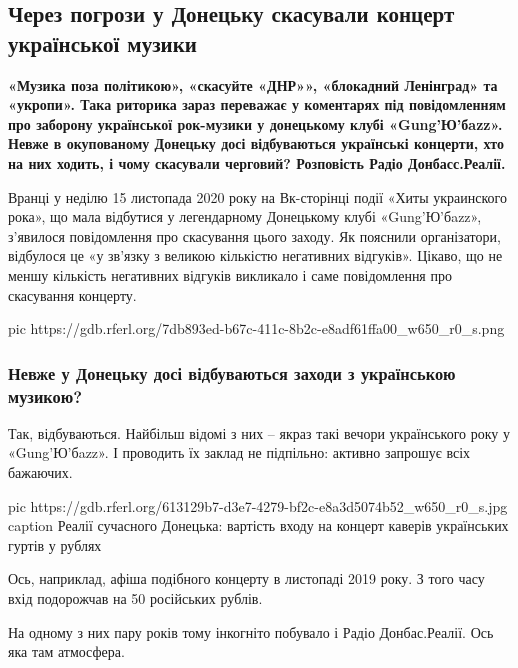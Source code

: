  
 
 
 
\subsection{Через погрози у Донецьку скасували концерт української музики}

{\bfseries
«Музика поза політикою», «скасуйте «ДНР»», «блокадний Ленінград» та
«укропи». Така риторика зараз переважає у коментарях під повідомленням
про заборону української рок-музики у донецькому клубі «Gung'Ю'бazz».
Невже в окупованому Донецьку досі відбуваються українські концерти, хто на
них ходить, і чому скасували черговий? Розповість Радіо Донбасс.Реалії.
}

Вранці у неділю 15 листопада 2020 року на Вк-сторінці події «Хиты украинского
рока», що мала відбутися у легендарному Донецькому клубі «Gung'Ю'бazz»,
з’явилося повідомлення про скасування цього заходу. Як пояснили організатори,
відбулося це «у зв’язку з великою кількістю негативних відгуків». Цікаво, що не
меншу кількість негативних відгуків викликало і саме повідомлення про
скасування концерту.

\ifcmt
pic https://gdb.rferl.org/7db893ed-b67c-411c-8b2c-e8adf61ffa00_w650_r0_s.png
\fi

\subsubsection{Невже у Донецьку досі відбуваються заходи з українською музикою?}

Так, відбуваються. Найбільш відомі з них – якраз такі вечори українського
року у «Gung'Ю'бazz». І проводить їх заклад не підпільно: активно запрошує
всіх бажаючих.

\ifcmt
pic https://gdb.rferl.org/613129b7-d3e7-4279-bf2c-e8a3d5074b52_w650_r0_s.jpg
caption Реалії сучасного Донецька: вартість входу на концерт каверів українських гуртів у рублях
\fi

Ось, наприклад, афіша подібного концерту в листопаді 2019 року. З того часу
вхід подорожчав на 50 російських рублів.

На одному з них пару років тому інкогніто побувало і Радіо Донбас.Реалії.
Ось яка там атмосфера.

